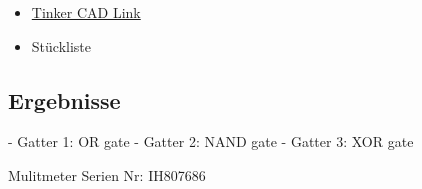 \begin{itemize}
    \item \href{https://www.tinkercad.com/things/7XiGVaMbiJp-3-realisierung-eines-logic-analyzers?sharecode=zr8OEADx1vwcRiCu8vCMqVJKR72VzTUJEwqNLhrm7_E}{Tinker CAD Link}
    \item Stückliste
\end{itemize}

\subsection{Ergebnisse}

- Gatter 1: OR gate 
- Gatter 2: NAND gate
- Gatter 3: XOR gate

Mulitmeter Serien Nr: IH807686
